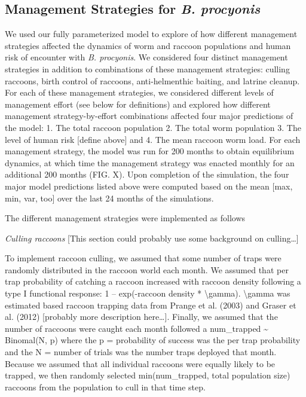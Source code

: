 \documentclass[11pt]{article}
\begin{document}
\subsection{Management Strategies for \emph{B. procyonis}}

We used our fully parameterized model to explore of how different
management strategies affected the dynamics of worm and raccoon
populations and human risk of encounter with \emph{B. procyonis}. We considered four
distinct management strategies in addition to combinations of these
management strategies: culling raccoons, birth control of raccoons,
anti-helmenthic baiting, and latrine cleanup. For each of these
management strategies, we considered different levels of management
effort (see below for definitions) and explored how different management
strategy-by-effort combinations affected four major predictions of the
model: 1. The total raccoon population 2. The total worm population 3.
The level of human risk [define above] and 4. The mean raccoon worm
load. For each management strategy, the model was run for 200 months to
obtain equilibrium dynamics, at which time the management strategy was
enacted monthly for an additional 200 months (FIG. X). Upon completion
of the simulation, the four major model predictions listed above were
computed based on the mean [max, min, var, too] over the last 24
months of the simulations.

The different management strategies were implemented as follows

\emph{Culling raccoons} [This section could probably use some
background on culling\ldots ]

To implement raccoon culling, we assumed that some number of traps were
randomly distributed in the raccoon world each month. We assumed that
per trap probability of catching a raccoon increased with raccoon
density following a type I functional response: 1 -- exp(-raccoon
density * \textbackslash{}gamma). \textbackslash{}gamma was estimated
based raccoon trapping data from Prange et al. (2003) and Graser et al.
(2012) {[}probably more description here\ldots{}{]}. Finally, we assumed
that the number of raccoons were caught each month followed a
num\_trapped \textasciitilde{} Binomal(N, p) where the p = probability
of success was the per trap probability and the N = number of trials was
the number traps deployed that month. Because we assumed that all
individual raccoons were equally likely to be trapped, we then randomly
selected min(num\_trapped, total population size) raccoons from the
population to cull in that time step.
\end{document}
